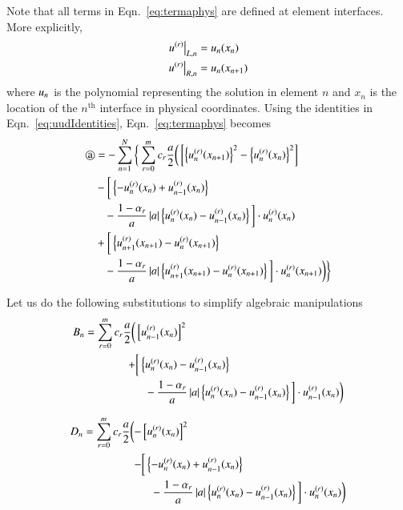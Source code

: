 Note that all terms in Eqn.~\eqref{eq:termaphys} are defined at element interfaces. More explicitly,
\begin{equation}
\label{eq:uudIdentities}
\begin{split}
{{u}^{(r)} \big|_{L,n}} &= u_n(x_n) \\
{{u}^{(r)} \big|_{R,n}} &= u_n(x_{n+1})
\end{split}
\end{equation}
where $u_n$ is the polynomial representing the solution in element $n$ and $x_n$ is the location
of the $n^\text{th}$ interface in physical coordinates.
Using the identities in Eqn.~\eqref{eq:uudIdentities}, Eqn.~\eqref{eq:termaphys} becomes
\begin{equation}
\label{eq:telSum0}
\begin{split}
 \text{\textcircled{a}} &= -\sum_{n=1}^{N}  \bigg\{
 \sum^m_{r=0} c_r \frac{a}{2}
 \bigg(  
 \l[ \l\{\uudrx{n}{n+1}\r\}^2  - \l\{\uudrx{n}{n}\r\}^2 \r] \\
 &- \bigg[ \l\{-\uudrx{n}{n} + \uudrx{n-1}{n} \r\} \\
 &\mbox{\;\;\;}- \frac{1-{\alpha_r}}{a} \l|a\r|
\l\{\uudrx{n}{n} 
-
\uudrx{n-1}{n} \r\} \bigg]
%
 \cdot \uudrx{n}{n}\\
 &+  \bigg[ \l\{ \uudrx{n+1}{n+1} - \uudrx{n}{n+1} \r\} \\
 &\mbox{\;\;\;}- \frac{1-{\alpha_r}}{a} \l|a\r|
\l\{\uudrx{n+1}{n+1} - \uudrx{n}{n+1} \r\} \bigg]
 \cdot \uudrx{n}{n+1} 
\bigg)
 \bigg\} 
\end{split}
\end{equation}

Let us do the following substitutions to simplify algebraic manipulations
\begin{equation}
\label{eq:Bn}
\begin{split}
B_n = \sum^m_{r=0} c_r \frac{a}{2} \bigg( &\left[{{u}^{(r)}_{n-1}(x_{n})}\right]^2  \\
+ & \bigg[ \left\{{{u}^{(r)}_{n}(x_{n})} - {{u}^{(r)}_{n-1}(x_{n})} \right\} \\
&\mbox{\;\;\;}- \frac{1-{\alpha_r}}{a} \left|a\right| \left\{{{u}^{(r)}_{n}(x_{n})} 
- {{u}^{(r)}_{n-1}(x_{n})} \right\} \bigg] \cdot {{u}^{(r)}_{n-1}(x_{n})} \bigg)
\end{split}
\end{equation}

\begin{equation}
\label{eq:Dn}
\begin{split}
 D_n = \sum^m_{r=0} c_r \frac{a}{2} \bigg(- &\left[{{u}^{(r)}_{n}(x_{n})}\right]^2 \\
 - & \bigg[ \left\{-{{u}^{(r)}_{n}(x_{n})} + {{u}^{(r)}_{n-1}(x_{n})} \right\} \\
 &\mbox{\;\;\;}- \frac{1-{\alpha_r}}{a} \left|a\right|
\left\{{{u}^{(r)}_{n}(x_{n})} 
- {{u}^{(r)}_{n-1}(x_{n})} \right\} \bigg] \cdot {{u}^{(r)}_{n}(x_{n})} \bigg)
\end{split}
\end{equation}



